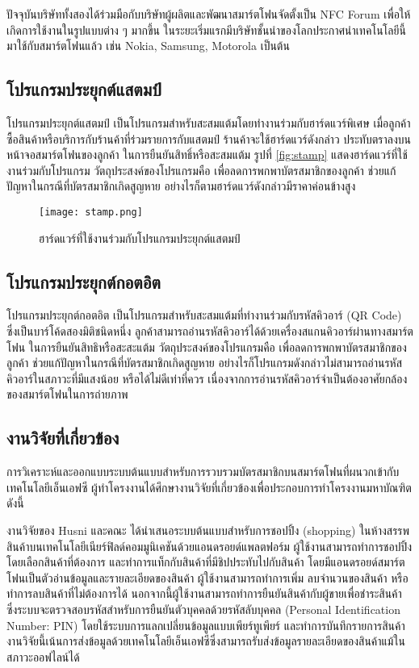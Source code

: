 \documentclass[12pt,a4paper,twocolumn]{article}
\begin{document}
ปัจจุบันบริษัททั้งสองได้ร่วมมือกับบริษัทผู้ผลิตและพัฒนาสมาร์ตโฟนจัดตั้งเป็น NFC Forum เพื่อให้เกิดการใช้งานในรูปแบบต่าง ๆ มากขึ้น ในระยะเริ่มแรกมีบริษัทชั้นนำของโลกประกาศนำเทคโนโลยีนี้มาใช้กับสมาร์ตโฟนแล้ว เช่น Nokia, Samsung, Motorola เป็นต้น

\subsection{โปรแกรมประยุกต์แสตมป์}
โปรแกรมประยุกต์แสตมป์ เป็นโปรแกรมสำหรับสะสมแต้มโดยทำงานร่วมกับฮาร์ดแวร์พิเศษ เมื่อลูกค้าซื้อสินค้าหรือบริการกับร้านค้าที่ร่วมรายการกับแสตมป์ ร้านค้าจะใช้ฮาร์ดแวร์ดังกล่าว ประทับตราลงบนหน้าจอสมาร์ตโฟนของลูกค้า ในการยืนยันสิทธิ์หรือสะสมแต้ม รูปที่ \ref{fig:stamp} แสดงฮาร์ดแวร์ที่ใช้งานร่วมกับโปรแกรม วัตถุประสงค์ของโปรแกรมคือ เพื่อลดการพกพาบัตรสมาชิกของลูกค้า ช่วยแก้ปัญหาในกรณีที่บัตรสมาชิกเกิดสูญหาย อย่างไรก็ตามฮาร์ดแวร์ดังกล่าวมีราคาค่อนข้างสูง

\begin{figure}[ht!]
\centering
\texttt{[image: stamp.png]}
\caption{ฮาร์ดแวร์ที่ใช้งานร่วมกับโปรแกรมประยุกต์แสตมป์} \label{fig:stamp}
\label{overflow}
\end{figure}

\subsection{โปรแกรมประยุกต์กอตอิต}
โปรแกรมประยุกต์กอตอิต เป็นโปรแกรมสำหรับสะสมแต้มที่ทำงานร่วมกับรหัสคิวอาร์ (QR Code) ซึ่งเป็นบาร์โค้ดสองมิติชนิดหนึ่ง ลูกค้าสามารถอ่านรหัสคิวอาร์ได้ด้วยเครื่องสแกนคิวอาร์ผ่านทางสมาร์ตโฟน ในการยืนยันสิทธิหรือสะสะแต้ม วัตถุประสงค์ของโปรแกรมคือ เพื่อลดการพกพาบัตรสมาชิกของลูกค้า ช่วยแก้ปัญหาในกรณีที่บัตรสมาชิกเกิดสูญหาย อย่างไรก็โปรแกรมดังกล่าวไม่สามารถอ่านรหัสคิวอาร์ในสภาวะที่มีแสงน้อย หรือได้ไม่ดีเท่าที่ควร เนื่องจากการอ่านรหัสคิวอาร์จำเป็นต้องอาศัยกล้องของสมาร์ตโฟนในการถ่ายภาพ

\subsection{งานวิจัยที่เกี่ยวข้อง}
การวิเคราะห์และออกแบบระบบต้นแบบสำหรับการรวบรวมบัตรสมาชิกบนสมาร์ตโฟนที่ผนวกเข้ากับเทคโนโลยีเอ็นเอฟซี ผู้ทำโครงงานได้ศึกษางานวิจัยที่เกี่ยวข้องเพื่อประกอบการทําโครงงานมหาบัณฑิต ดังนี้

งานวิจัยของ Husni และคณะ \cite{itm:shopping} ได้นำเสนอระบบต้นแบบสำหรับการชอปปิ้ง (shopping) ในห้างสรรพสินค้าบนเทคโนโลยีเนียร์ฟิลด์คอมมูนิเคชันด้วยแอนดรอยด์แพลตฟอร์ม ผู้ใช้งานสามารถทำการชอปปิ้งโดยเลือกสินค้าที่ต้องการ และทำการแท็กกับสินค้าที่มีชิปประทับไปกับสินค้า โดยมีแอนดรอยด์สมาร์ตโฟนเป็นตัวอ่านข้อมูลและรายละเอียดของสินค้า ผู้ใช้งานสามารถทำการเพิ่ม ลบจำนวนของสินค้า หรือทำการลบสินค้าที่ไม่ต้องการได้ นอกจากนี้ผู้ใช้งานสามารถทำการยืนยันสินค้ากับผู้ขายเพื่อชำระสินค้า ซึ่งระบบจะตรวจสอบรหัสสำหรับการยืนยันตัวบุคคลด้วยรหัสลับบุคคล (Personal Identification Number: PIN) โดยใช้ระบบการแลกเปลี่ยนข้อมูลแบบเพียร์ทูเพียร์ และทำการบันทึกรายการสินค้า งานวิจัยนี้เน้นการส่งข้อมูลด้วยเทคโนโลยีเอ็นเอฟซีซึ่งสามารถรับส่งข้อมูลรายละเอียดของสินค้าแม้ในสภาวะออฟไลน์ได้
\end{document}
